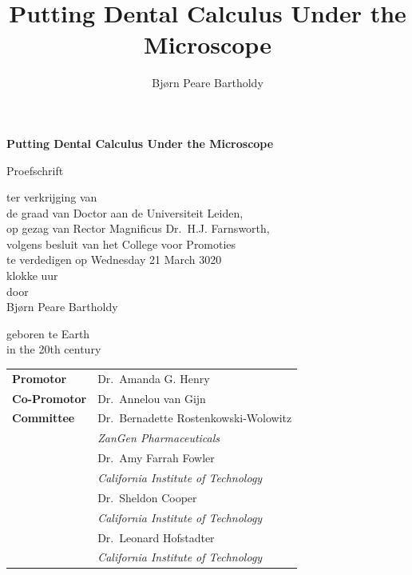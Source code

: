 \documentclass[
  letterpaper,
]{book}
\title{Putting Dental Calculus Under the Microscope}
\author{Bjørn Peare Bartholdy}
\date{}
\begin{document}
\clearpage
\thispagestyle{empty}
\begin{center}
\Huge\textbf{Putting Dental Calculus Under the Microscope}\par
\vspace{\baselineskip}
\huge\textit{}\par
\vfill %
    \Large{Proefschrift}\par
    \vspace{\baselineskip}
    \linespread{1.3}
    \large{ter verkrijging van \\
    de graad van Doctor aan de Universiteit Leiden, \\
    op gezag van Rector Magnificus Dr.~H.J. Farnsworth, \\
    volgens besluit van het College voor Promoties \\
    te verdedigen op Wednesday 21 March 3020 \\
    klokke  uur \\[1.5cm]
    door} \\[1.5cm]
    \Large{Bjørn Peare Bartholdy}\par
    \vspace{\baselineskip}
    \large{geboren te Earth \\
    in the 20th century}
\end{center}

\clearpage
\thispagestyle{empty}

\noindent\begin{tabular}{p{8em} l}
    \large
    \textbf{Promotor}  & \large Dr.~Amanda G. Henry  \\ 
    \rule{0pt}{4ex}\large\textbf{Co-Promotor}  & \large Dr.~Annelou van
Gijn  \\ 
    \large
    \rule{0pt}{8ex}\textbf{Committee}  & \rule{0pt}{4ex}\large Dr.~Bernadette
Rostenkowski-Wolowitz  \\
    & \indent\textit{ZanGen
Pharmaceuticals} \\  & \rule{0pt}{4ex}\large Dr.~Amy Farrah Fowler  \\
    & \indent\textit{California Institute of
Technology} \\  & \rule{0pt}{4ex}\large Dr.~Sheldon Cooper  \\
    & \indent\textit{California Institute of
Technology} \\  & \rule{0pt}{4ex}\large Dr.~Leonard Hofstadter  \\
    & \indent\textit{California Institute of Technology} \\ 
\end{tabular}
\end{document}
